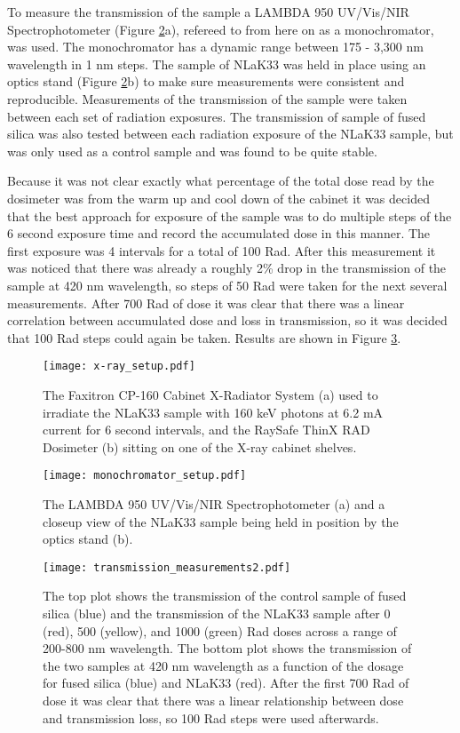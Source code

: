 To measure the transmission of the sample a LAMBDA 950 UV/Vis/NIR Spectrophotometer \cite{Monochromator} (Figure \ref{fig:monochromator_setup}a), refereed to from here on as a monochromator, was used. The monochromator has a dynamic range between 175 - 3,300 nm wavelength in 1 nm steps. The sample of NLaK33 was held in place using an optics stand (Figure \ref{fig:monochromator_setup}b) to make sure measurements were consistent and reproducible. Measurements of the transmission of the sample were taken between each set of radiation exposures. The transmission of sample of fused silica was also tested between each radiation exposure of the NLaK33 sample, but was only used as a control sample and was found to be quite stable.

Because it was not clear exactly what percentage of the total dose read by the dosimeter was from the warm up and cool down of the cabinet it was decided that the best approach for exposure of the sample was to do multiple steps of the 6 second exposure time and record the accumulated dose in this manner. The first exposure was 4 intervals for a total of 100 Rad. After this measurement it was noticed that there was already a roughly 2\% drop in the transmission of the sample at 420 nm wavelength, so steps of 50 Rad were taken for the next several measurements. After 700 Rad of dose it was clear that there was a linear correlation between accumulated dose and loss in transmission, so it was decided that 100 Rad steps could again be taken. Results are shown in Figure \ref{fig:transmission_measurements}.

\begin{figure}[!htb]
	\centering
	\texttt{[image: x-ray\_setup.pdf]}
	\caption{The Faxitron CP-160 Cabinet X-Radiator System (a) used to irradiate the NLaK33 sample with 160 keV photons at 6.2 mA current for 6 second intervals, and the RaySafe ThinX RAD Dosimeter (b) sitting on one of the X-ray cabinet shelves.}
	\label{fig:x-ray_setup}
\end{figure}


\begin{figure}[!htb]
	\centering
	\texttt{[image: monochromator\_setup.pdf]}
	\caption{The LAMBDA 950 UV/Vis/NIR Spectrophotometer (a) and a closeup view of the NLaK33 sample being held in position by the optics stand (b).}
	\label{fig:monochromator_setup}
\end{figure}

\begin{figure}[!htb]
	\centering
	\texttt{[image: transmission\_measurements2.pdf]}
	\caption{The top plot shows the transmission of the control sample of fused silica (blue) and the transmission of the NLaK33 sample after 0 (red), 500 (yellow), and 1000 (green) Rad doses across a range of 200-800 nm wavelength. The bottom plot shows the transmission of the two samples at 420 nm wavelength as a function of the dosage for fused silica (blue) and NLaK33 (red). After the first 700 Rad of dose it was clear that there was a linear relationship between dose and transmission loss, so 100 Rad steps were used afterwards.}
	\label{fig:transmission_measurements}
\end{figure}

